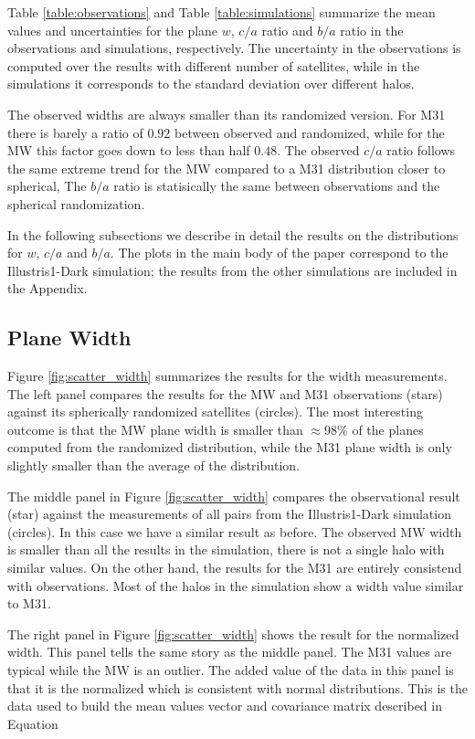 \documentclass[a4paper,fleqn,usenatbib]{mnras}
\begin{document}
Table \ref{table:observations} and Table \ref{table:simulations}
summarize the mean values and uncertainties for the plane $w$, $c/a$
ratio and $b/a$ ratio in the observations and simulations, respectively. 
The uncertainty in the observations is computed over the results with
different number of satellites, while in the simulations it
corresponds to the standard deviation over different halos. 

The observed widths are always smaller than its randomized version.
For M31 there is barely a ratio of $0.92$ between observed and
randomized, while for the MW this factor goes down to less than half
$0.48$. 
The observed $c/a$ ratio follows the same extreme trend for
the MW compared to a M31 distribution closer to spherical, 
The $b/a$ ratio is statisically the same between observations and the
spherical randomization. 


In the following subsections we describe in detail the results on the 
distributions for $w$, $c/a$ and $b/a$. 
The plots in the main body of the paper correspond to the
Illustris1-Dark simulation; the results from the other simulations are
included in the Appendix.

\subsection{Plane Width}

Figure \ref{fig:scatter_width} summarizes the results for the width
measurements.
The left panel compares the results for the MW and M31
observations (stars) against its spherically randomized satellites
(circles). 
The most interesting outcome is that the MW plane width is smaller
than $\approx 98\%$ of the planes computed from the randomized distribution,
while the M31 plane width is only slightly smaller than the average of
the distribution.

The middle panel in Figure \ref{fig:scatter_width} compares the
observational result (star) against the measurements of all pairs from the Illustris1-Dark
simulation (circles).
In this case we have a similar result as before. 
The observed MW width is smaller than all the results in the
simulation, there is not a single halo with similar values.
On the other hand, the results for the M31 are entirely consistend
with observations. Most of the halos in the simulation show a width
value similar to M31. 

The right panel in Figure \ref{fig:scatter_width} shows the result for
the normalized width.  
This panel tells the same story as the middle panel. The M31 values
are typical while the MW is an outlier. 
The added value of the data in this panel is that it is the normalized
which is consistent with normal distributions.
This is the data used to build the mean values vector and covariance
matrix described in Equation 
\end{document}
